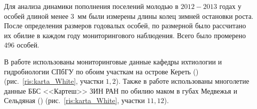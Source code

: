 Для анализа динамики пополнения поселений молодью в $2012 - 2013$ годах у особей длиной менее $3$~мм были измерены длины колец зимней остановки роста. 
После определения размеров годовалых особей, по размерной было рассчитано их обилие в каждом году мониторингового наблюдения.
Всего было промерено 496 особей.



В работе использованы мониторинговые данные кафедры ихтиологии и гидробиологии СПбГУ по обоим участкам на острове Кереть (\cite{Maximovich_et_al_1991, Gerasimova_Maximovich_2013}) (рис.~\ref{ris:karta_White}, участки $1, 2$). 
Также в работе использованы многолетие данные ББС <<Картеш>> ЗИН РАН по обилию маком в губах Медвежья и Сельдяная (\cite{Varfolomeeva_Naumov_2013}) (рис.~\ref{ris:karta_White}, участки $11, 12$).


 




